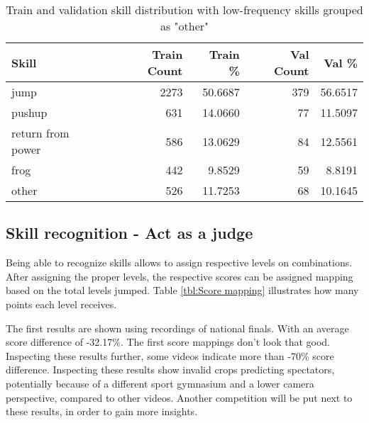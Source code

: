 \begin{table}[h!]
    \centering
    \begin{tabular}{|l|r|r|r|r|}
        \hline
        \textbf{Skill} & \textbf{Train Count} & \textbf{Train \%} & \textbf{Val Count} & \textbf{Val \%} \\
        \hline
        jump & 2273 & 50.6687 & 379 & 56.6517 \\
        pushup & 631 & 14.0660 & 77 & 11.5097 \\
        return from power & 586 & 13.0629 & 84 & 12.5561 \\
        frog & 442 & 9.8529 & 59 & 8.8191 \\
        other & 526 & 11.7253 & 68 & 10.1645 \\
        \hline
    \end{tabular}
    \caption[Skill distribution skills limited classes]{Train and validation skill distribution with low-frequency skills grouped as "other"}
    \label{tab:skill_distribution_grouped_final}
\end{table}

\subsection{Skill recognition - Act as a judge}
\label{results:skill-recognition-act-as-a-judge}

Being able to recognize skills allows to assign respective levels on combinations. After assigning the proper levels, the respective scores can be assigned mapping based on the total levels jumped. Table \ref{tbl:Score mapping} illustrates how many points each level receives.

The first results are shown using recordings of national finals. With an average score difference of -32.17\%. The first score mappings don't look that good.
Inspecting these results further, some videos indicate more than -70\% score difference. Inspecting these results show invalid crops predicting spectators, potentially because of a different sport gymnasium and a lower camera perspective, compared to other videos.
Another competition will be put next to these results, in order to gain more insights.

